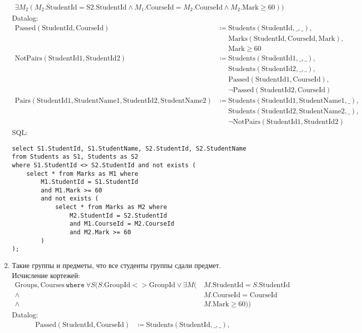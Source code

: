 \documentclass{article}
\newcommand{\Students}{\mathrm{Students}}
\newcommand{\Sw}{\mathrm{S2}}
\newcommand{\Sqi}{\mathrm{StudentId1}}
\newcommand{\Swi}{\mathrm{StudentId2}}
\newcommand{\Sqn}{\mathrm{StudentName1}}
\newcommand{\Swn}{\mathrm{StudentName2}}
\newcommand{\StudentId}{\mathrm{StudentId}}
\newcommand{\Groups}{\mathrm{Groups}}
\newcommand{\GroupId}{\mathrm{GroupId}}
\newcommand{\Courses}{\mathrm{Courses}}
\newcommand{\CourseId}{\mathrm{CourseId}}
\newcommand{\Marks}{\mathrm{Marks}}
\newcommand{\Mark}{\mathrm{Mark}}
\newcommand{\where}{~\mathtt{where}~}
\newcommand{\poloneq}{\mathrel{\phantom{\coloneq}}}
\begin{document}
\begin{enumerate}
\begin{align*}
            \exists M_2 (M_2.\StudentId = \Sw.\StudentId
            \land M_1.\CourseId = M_2.\CourseId
            \land M_2.\Mark \geq 60))
    \end{align*}
    Datalog:
    \begin{align*}
        \mathrm{Passed}(\StudentId, \CourseId)
        &\coloneq \Students(\StudentId, \_, \_), \\
        &\poloneq \Marks(\StudentId, \CourseId, \Mark), \\
        &\poloneq \Mark \geq 60 \\
        \mathrm{NotPairs}(\Sqi, \Swi)
        &\coloneq \Students(\Sqi, \_, \_), \\
        &\poloneq \Students(\Swi, \_, \_), \\
        &\poloneq \mathrm{Passed}(\Sqi, \CourseId), \\
        &\poloneq \neg \mathrm{Passed}(\Swi, \CourseId) \\
        \mathrm{Pairs}(\Sqi, \Sqn, \Swi, \Swn)
        &\coloneq \Students(\Sqi, \Sqn, \_), \\
        &\poloneq \Students(\Swi, \Swn, \_), \\
        &\poloneq \neg \mathrm{NotPairs}(\Sqi, \Swi)
    \end{align*}
    SQL:
    \begin{verbatim}
select S1.StudentId, S1.StudentName, S2.StudentId, S2.StudentName
from Students as S1, Students as S2
where S1.StudentId <> S2.StudentId and not exists (
    select * from Marks as M1 where
        M1.StudentId = S1.StudentId
        and M1.Mark >= 60
        and not exists (
            select * from Marks as M2 where
                M2.StudentId = S2.StudentId
                and M1.CourseId = M2.CourseId
                and M2.Mark >= 60
        )
);
    \end{verbatim}
    \item Такие группы и предметы, что все студенты группы сдали предмет.
    Исчисление кортежей:
    \begin{align*}
        \Groups, \Courses \where
        \forall S (S.\GroupId <> \GroupId
        \lor \exists M (&\ M.\StudentId = S.\StudentId \\
        \land&\ M.\CourseId = \CourseId \\
        \land&\ M.\Mark \geq 60))
    \end{align*}
    Datalog:
    \begin{align*}
        \mathrm{Passed}(\StudentId, \CourseId)
        &\coloneq \Students(\StudentId, \_, \_), \\

\end{align*}
\end{enumerate}
\end{document}
